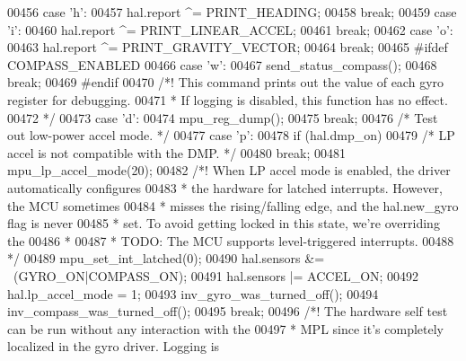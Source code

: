 \begin{DoxyCode}
{{{{{{{{00456     \textcolor{keywordflow}{case} \textcolor{stringliteral}{'h'}:
00457         hal.report ^= PRINT_HEADING;
00458         \textcolor{keywordflow}{break};
00459     \textcolor{keywordflow}{case} \textcolor{stringliteral}{'i'}:
00460         hal.report ^= PRINT_LINEAR_ACCEL;
00461         \textcolor{keywordflow}{break};
00462     \textcolor{keywordflow}{case} \textcolor{stringliteral}{'o'}:
00463         hal.report ^= PRINT_GRAVITY_VECTOR;
00464         \textcolor{keywordflow}{break};
00465 \textcolor{preprocessor}{#}\textcolor{preprocessor}{ifdef} \textcolor{preprocessor}{COMPASS\_ENABLED}
00466     \textcolor{keywordflow}{case} \textcolor{stringliteral}{'w'}:
00467         send\_status\_compass();
00468         \textcolor{keywordflow}{break};
00469 \textcolor{preprocessor}{#}\textcolor{preprocessor}{endif}
00470     \textcolor{comment}{/*! This command prints out the value of each gyro register for debugging.}
00471 \textcolor{comment}{     * If logging is disabled, this function has no effect.}
00472 \textcolor{comment}{     */}
00473     \textcolor{keywordflow}{case} \textcolor{stringliteral}{'d'}:
00474         mpu\_reg\_dump();
00475         \textcolor{keywordflow}{break};
00476     \textcolor{comment}{/* Test out low-power accel mode. */}
00477     \textcolor{keywordflow}{case} \textcolor{stringliteral}{'p'}:
00478         \textcolor{keywordflow}{if} (hal.dmp_on)
00479             \textcolor{comment}{/* LP accel is not compatible with the DMP. */}
00480             \textcolor{keywordflow}{break};
00481         mpu\_lp\_accel\_mode(20);
00482         \textcolor{comment}{/*! When LP accel mode is enabled, the driver automatically configures}
00483 \textcolor{comment}{         * the hardware for latched interrupts. However, the MCU sometimes}
00484 \textcolor{comment}{         * misses the rising/falling edge, and the hal.new\_gyro flag is never}
00485 \textcolor{comment}{         * set. To avoid getting locked in this state, we're overriding the}
00486 \textcolor{comment}{         *}
00487 \textcolor{comment}{         * TODO: The MCU supports level-triggered interrupts.}
00488 \textcolor{comment}{         */}
00489         mpu\_set\_int\_latched(0);
00490         hal.sensors &= ~(GYRO_ON|COMPASS_ON);
00491         hal.sensors |= ACCEL_ON;
00492         hal.lp_accel_mode = 1;
00493         inv\_gyro\_was\_turned\_off();
00494         inv\_compass\_was\_turned\_off();
00495         \textcolor{keywordflow}{break};
00496     \textcolor{comment}{/*! The hardware self test can be run without any interaction with the}
00497 \textcolor{comment}{     * MPL since it's completely localized in the gyro driver. Logging is}
}}}}}}}}
\end{DoxyCode}
